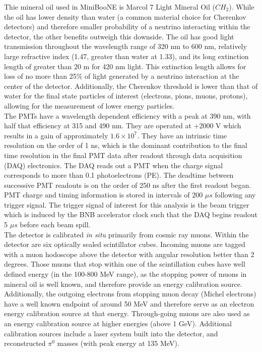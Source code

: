Thie mineral oil used in MiniBooNE is Marcol 7 Light Mineral Oil ($CH_2$). While the oil has lower density than water (a common material choice for Cherenkov detectors) and therefore smaller probability of a neutrino interacting within the detector, the other benefits outweigh this downside. The oil has good light transmission throughout the wavelength range of 320 nm to 600 nm, relatively large refractive index (1.47, greater than water at 1.33), and its long extinction length of greater than 20 m for 420 nm light. This extinction length allows for loss of no more than 25\% of light generated by a neutrino interaction at the center of the detector. Additionally, the Cherenkov threshold is lower than that of water for the final state particles of interest (electrons, pions, muons, protons), allowing for the measurement of lower energy particles.\\

The PMTs have a wavelength dependent efficiency with a peak at 390 nm, with half that efficiency at 315 and 490 nm. They are operated at +2000 V which results in a gain of approximately $1.6 \times 10^7$. They have an intrinsic time resolution on the order of 1 ns, which is the dominant contribution to the final time resolution in the final PMT data after readout through data acquisition (DAQ) electronics. The DAQ reads out a PMT when the charge signal corresponds to more than 0.1 photoelectrons (PE). The deadtime between successive PMT readouts is on the order of 250 ns after the first readout began. PMT charge and timing information is stored in intervals of 200 $\mu s$ following any trigger signal. The trigger signal of interest for this analysis is the beam trigger which is induced by the BNB accelerator clock such that the DAQ begins readout 5 $\mu s$ before each beam spill.\\

The detector is calibrated \textit{in situ} primarily from cosmic ray muons. Within the detector are six optically sealed scintillator cubes. Incoming muons are tagged with a muon hodoscope above the detector with angular resolution better than 2 degrees. Those muons that stop within one of the scintillation cubes have well defined energy (in the 100-800 MeV range), as the stopping power of muons in mineral oil is well known, and therefore provide an energy calibration source. Additionally, the outgoing electrons from stopping muon decay (Michel electrons) have a well known endpoint of around 50 MeV and therefore serve as an electron energy calibration source at that energy. Through-going muons are also used as an energy calibration source at higher energies (above 1 GeV). Additional calibration sources include a laser system built into the detector, and reconstructed $\pi^0$ masses (with peak energy at 135 MeV).

